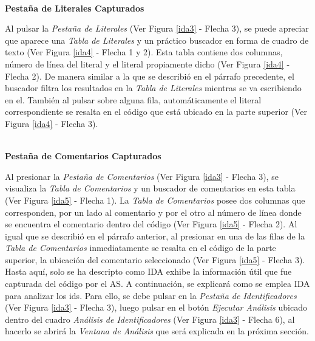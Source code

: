 \noindent \textbf{\\Pestaña de Literales Capturados\\} 

Al pulsar la \textit{Pestaña de Literales} (Ver Figura \ref{ida3} - Flecha 3), se puede apreciar que aparece una \textit{Tabla de Literales} y un práctico buscador en forma de cuadro de texto (Ver Figura \ref{ida4} - Flecha 1 y 2). Esta tabla contiene dos columnas, número de línea del literal y el literal propiamente dicho (Ver Figura \ref{ida4} - Flecha 2).
De manera similar a la que se describió en el párrafo precedente, el buscador filtra los resultados en la \textit{Tabla de Literales} mientras se va escribiendo en el. También al pulsar sobre alguna fila, automáticamente el literal correspondiente se resalta en el código que está ubicado en la parte superior (Ver Figura \ref{ida4} - Flecha 3).

\noindent \textbf{\\Pestaña de Comentarios Capturados\\} 

Al presionar la \textit{Pestaña de Comentarios} (Ver Figura \ref{ida3} - Flecha 3), se visualiza la \textit{Tabla de Comentarios} y un buscador de comentarios en esta tabla (Ver Figura \ref{ida5} - Flecha 1). La \textit{Tabla de Comentarios} posee dos columnas que corresponden, por un lado al comentario y por el otro al número de línea donde se encuentra el comentario dentro del código (Ver Figura \ref{ida5} - Flecha 2). Al igual que se describió en el párrafo anterior, al presionar en una de las filas de la \textit{Tabla de Comentarios} inmediatamente se resalta en el código de la parte superior, la ubicación del comentario seleccionado (Ver Figura \ref{ida5} - Flecha 3).\\

Hasta aquí, solo se ha descripto como IDA exhibe la información útil que fue capturada del código por el AS. A continuación, se explicará como se emplea IDA para analizar los ids. Para ello, se debe pulsar en la \textit{Pestaña de Identificadores} (Ver Figura \ref{ida3} - Flecha 3), luego pulsar en el botón \textit{Ejecutar Análisis} ubicado dentro del cuadro \textit{Análisis de Identificadores} (Ver Figura \ref{ida3} - Flecha 6), al hacerlo se abrirá la \textit{Ventana de Análisis} que será explicada en la próxima sección.

